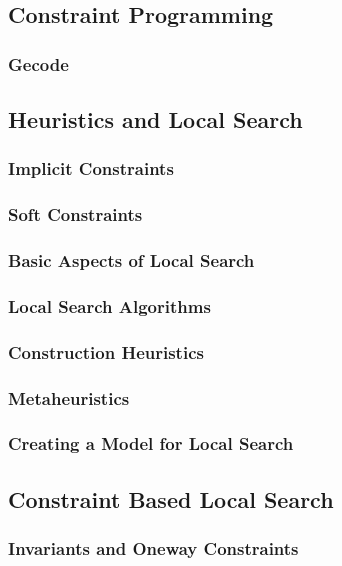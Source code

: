 \documentclass[a4paper,11pt]{article}
\begin{document}
  \subsection{Constraint Programming}
  
    \subsubsection{Gecode}
    
  \subsection{Heuristics and Local Search}
  
        \subsubsection{Implicit Constraints}
    
        \subsubsection{Soft Constraints}
    
     \subsubsection{Basic Aspects of Local Search}
    
    \subsubsection{Local Search Algorithms}
     \label{sub_lsalg}
    \subsubsection{Construction Heuristics}
    
    \subsubsection{Metaheuristics}
    
    \subsubsection{Creating a Model for Local Search}
    
  \subsection{Constraint Based Local Search}
  
    \subsubsection{Invariants and Oneway Constraints}
    
\end{document}
